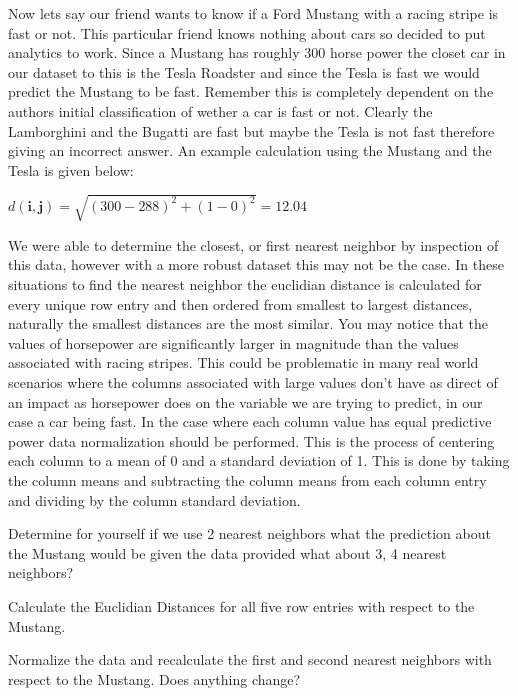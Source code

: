 Now lets say our friend wants to know if a Ford Mustang with a racing
stripe is fast or not. This particular friend knows nothing about cars
so decided to put analytics to work. Since a Mustang has roughly 300
horse power the closet car in our dataset to this is the Tesla
Roadster and since the Tesla is fast we would predict the Mustang to
be fast. Remember this is completely dependent on the authors initial
classification of wether a car is fast or not. Clearly the Lamborghini
and the Bugatti are fast but maybe the Tesla is not fast therefore
giving an incorrect answer. An example calculation using the Mustang
and the Tesla is given below: 

${d(\mathbf{i},\mathbf{j})}  =
\sqrt{{(300 - 288)^2 + (1 - 0)^2 } }  = 12.04 $

We were able to determine the closest, or first nearest neighbor by
inspection of this data, however with a more robust dataset this may
not be the case. In these situations to find the nearest neighbor the
euclidian distance is calculated for every unique row entry and then
ordered from smallest to largest distances, naturally the smallest
distances are the most similar. You may notice that the values of
horsepower are significantly larger in magnitude than the values
associated with racing stripes. This could be problematic in many real
world scenarios where the columns associated with large values don't
have as direct of an impact as horsepower does on the variable we are
trying to predict, in our case a car being fast. In the case where
each column value has equal predictive power data normalization should
be performed. This is the process of centering each column to a mean
of 0 and a standard deviation of 1. This is done by taking the column
means and subtracting the column means from each column entry and
dividing by the column standard deviation. 

\begin{exercise} Determine for yourself if we use 2 nearest neighbors what the
prediction about the Mustang would be given the data provided what
about 3, 4  nearest neighbors? 
\end{exercise}

\begin{exercise} Calculate the Euclidian Distances for all five row
  entries with respect to the Mustang.
\end{exercise}

\begin{exercise} Normalize the data and recalculate the first and
  second nearest neighbors with respect to the Mustang. Does anything
  change? 
\end{exercise}

